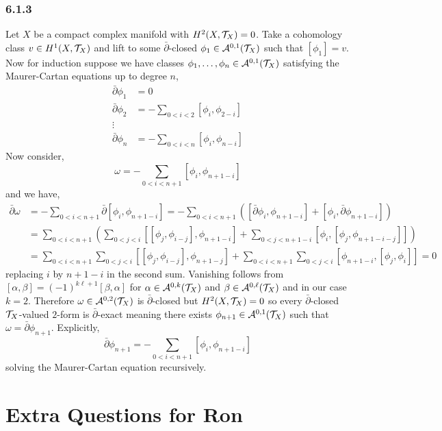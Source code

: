 \documentclass[12pt]{article}
\begin{document}
\subsubsection{6.1.3}

Let $X$ be a compact complex manifold with $H^2(X, \mathcal{T}_X) = 0$. Take a cohomology class $v \in H^1(X, \mathcal{T}_X)$ and lift to some $\bar{\partial}$-closed $\phi_1 \in \mathcal{A}^{0,1}(\mathcal{T}_X)$ such that $[\phi_1] = v$. Now for induction suppose we have classes $\phi_1, \dots, \phi_n \in \mathcal{A}^{0,1}(\mathcal{T}_X)$ satisfying the Maurer-Cartan equations up to degree $n$,
\begin{align*}
\bar{\partial} \phi_1 & = 0
\\
\bar{\partial} \phi_2 & = - \sum_{0 < i < 2} [\phi_i, \phi_{2-i}] 
\\
\vdots &
\\
\bar{\partial} \phi_n & = - \sum_{0 < i < n} [\phi_i, \phi_{n-i}]
\end{align*}
Now consider,
\[ \omega =  - \sum_{0 < i < n+1} [\phi_{i}, \phi_{n+1-i}] \]
and we have,
\begin{align*}
\bar{\partial} \omega & = - \sum_{0 < i < n+1} \bar{\partial} [\phi_i, \phi_{n+1 - i}] = - \sum_{0 < i < n+1} \left( [ \bar{\partial} \phi_i, \phi_{n+1-i}] + [\phi_i, \bar{\partial} \phi_{n+1-i}] \right)
\\
& = \sum_{0 < i < n+1} \left( \sum_{0 < j < i} [[\phi_j, \phi_{i-j}], \phi_{n+1-i}] + \sum_{0 < j < n+1 - i} [\phi_i, [\phi_j, \phi_{n+1 - i - j}]] \right)
\\
& = \sum_{0 < i < n+1} \sum_{0 < j < i} [[\phi_j, \phi_{i-j}], \phi_{n+1 - j}] + \sum_{0 < i < n+1} \sum_{0 < j < i} [\phi_{n+1-i}, [\phi_j, \phi_{i}]] = 0
\end{align*}
replacing $i$ by $n+1 - i$ in the second sum. Vanishing follows from $[\alpha, \beta] = (-1)^{k\ell+1} [\beta, \alpha]$ for $\alpha \in \mathcal{A}^{0,k}(\mathcal{T}_X)$ and $\beta \in \mathcal{A}^{0, \ell}(\mathcal{T}_X)$ and in our case $k = 2$. Therefore $\omega \in \mathcal{A}^{0,2}(\mathcal{T}_X)$ is $\bar{\partial}$-closed but $H^2(X, \mathcal{T}_X) = 0$ so every $\bar{\partial}$-closed $\mathcal{T}_X$-valued $2$-form is $\bar{\partial}$-exact meaning there exists $\phi_{n+1} \in \mathcal{A}^{0,1}(\mathcal{T}_X)$ such that $\omega = \bar{\partial} \phi_{n+1}$. Explicitly,
\[ \bar{\partial} \phi_{n+1} = - \sum_{0 < i < n+1} [\phi_{i}, \phi_{n+1-i}] \]
solving the Maurer-Cartan equation recursively.

\section{Extra Questions for Ron}
\end{document}
